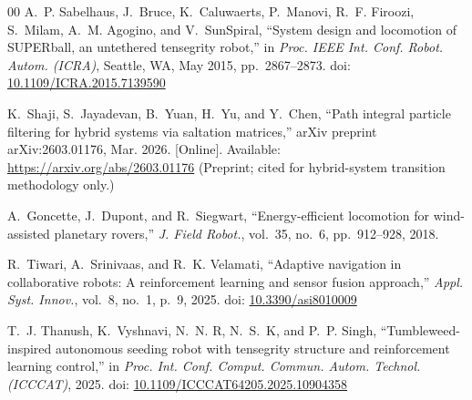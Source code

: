 \documentclass[conference]{IEEEtran}
\begin{document}
{\begin{thebibliography}{00}
A.~P. Sabelhaus, J.~Bruce, K.~Caluwaerts, P.~Manovi, R.~F. Firoozi,
S.~Milam, A.~M. Agogino, and V.~SunSpiral,
``System design and locomotion of {SUPERball}, an untethered tensegrity
robot,''
in \textit{Proc. IEEE Int. Conf. Robot. Autom. (ICRA)},
Seattle, WA, May 2015, pp.~2867--2873.
doi: \href{https://doi.org/10.1109/ICRA.2015.7139590}{10.1109/ICRA.2015.7139590}

K.~Shaji, S.~Jayadevan, B.~Yuan, H.~Yu, and Y.~Chen,
``Path integral particle filtering for hybrid systems via saltation
matrices,''
arXiv preprint arXiv:2603.01176, Mar. 2026.
[Online]. Available: \url{https://arxiv.org/abs/2603.01176}
(Preprint; cited for hybrid-system transition methodology only.)

A.~Goncette, J.~Dupont, and R.~Siegwart,
``Energy-efficient locomotion for wind-assisted planetary rovers,''
\textit{J. Field Robot.}, vol.~35, no.~6, pp.~912--928, 2018.

R.~Tiwari, A.~Srinivaas, and R.~K. Velamati,
``Adaptive navigation in collaborative robots: A reinforcement learning and
sensor fusion approach,''
\textit{Appl. Syst. Innov.}, vol.~8, no.~1, p.~9, 2025.
doi: \href{https://doi.org/10.3390/asi8010009}{10.3390/asi8010009}

T.~J. Thanush, K.~Vyshnavi, N.~N. R, N.~S.~K, and P.~P. Singh,
``Tumbleweed-inspired autonomous seeding robot with tensegrity structure and
reinforcement learning control,''
in \textit{Proc. Int. Conf. Comput. Commun. Autom. Technol. (ICCCAT)},
2025.
doi: \href{https://doi.org/10.1109/ICCCAT64205.2025.10904358}{10.1109/ICCCAT64205.2025.10904358}

\end{thebibliography}
}
\end{document}
